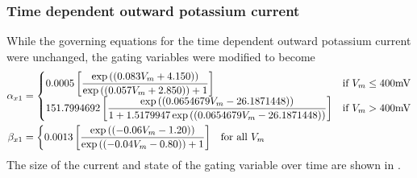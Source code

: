 \subsubsection{Time dependent outward potassium current}
While the governing equations for the time dependent outward potassium current
were unchanged, the gating variables were modified to become
\begin{gather}
  \label{eqn:brdr_ix1_coeffs}
  \begin{aligned}
    \alpha_{x1} &=
    \begin{cases}
      0.0005\left[ \dfrac{\exp\left( \left( 0.083V_m+4.150 \right) \right)}
        {\exp\left( \left( 0.057V_m+2.850 \right) \right)+1} \right]
        & \text{if $V_m \le 400\mathrm{mV}$} \\
      151.7994692\left[ \dfrac{\exp\left( \left( 0.0654679V_m-26.1871448 \right) \right)}
        {1+1.5179947\exp\left( \left( 0.0654679V_m-26.1871448 \right) \right)} \right]
        & \text{if $V_m > 400\mathrm{mV}$} 
    \end{cases} \\
    \beta_{x1} &=
    \begin{cases}
      0.0013\left[ \dfrac{\exp\left( \left( -0.06V_m-1.20 \right) \right)}
      {\exp\left( \left( -0.04V_m-0.80 \right) \right)+1} \right]
      & \text{for all $V_m$}
    \end{cases}
  \end{aligned}
\end{gather}
The size of the current and state of the gating variable over time are shown
in .
